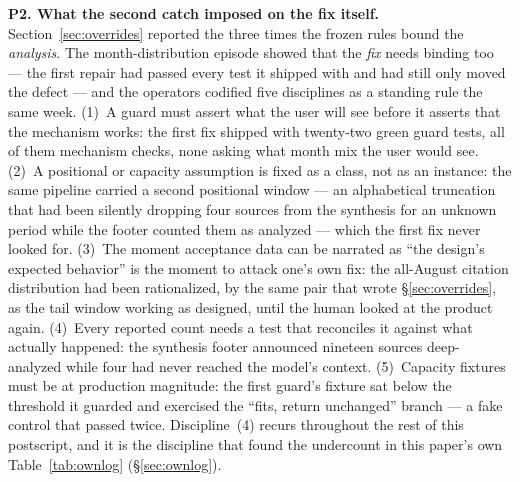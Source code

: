 \documentclass[11pt]{article}
\begin{document}
\textbf{P2. What the second catch imposed on the fix itself.}
Section~\ref{sec:overrides} reported the three times the frozen rules
bound the \emph{analysis}. The month-distribution episode showed that
the \emph{fix} needs binding too --- the first repair had passed every
test it shipped with and had still only moved the defect --- and the
operators codified five disciplines as a standing rule the same week.
(1)~A guard must assert what the user will see before it asserts that
the mechanism works: the first fix shipped with twenty-two green guard
tests, all of them mechanism checks, none asking what month mix the user
would see. (2)~A positional or capacity assumption is fixed as a class,
not as an instance: the same pipeline carried a second positional window
--- an alphabetical truncation that had been silently dropping four
sources from the synthesis for an unknown period while the footer
counted them as analyzed --- which the first fix never looked for.
(3)~The moment acceptance data can be narrated as ``the design's
expected behavior'' is the moment to attack one's own fix: the
all-August citation distribution had been rationalized, by the same pair
that wrote \S\ref{sec:overrides}, as the tail window working as
designed, until the human looked at the product again. (4)~Every
reported count needs a test that reconciles it against what actually
happened: the synthesis footer announced nineteen sources deep-analyzed
while four had never reached the model's context. (5)~Capacity fixtures
must be at production magnitude: the first guard's fixture sat below the
threshold it guarded and exercised the ``fits, return unchanged'' branch
--- a fake control that passed twice. Discipline~(4) recurs throughout
the rest of this postscript, and it is the discipline that found the
undercount in this paper's own Table~\ref{tab:ownlog}
(\S\ref{sec:ownlog}).
\end{document}
